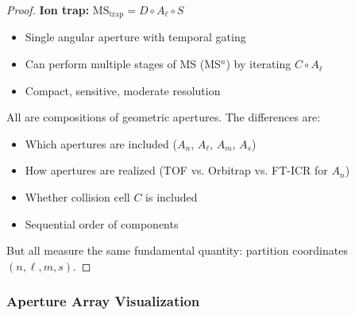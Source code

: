\begin{proof}
\textbf{Ion trap:} $\text{MS}_{\text{trap}} = D \circ A_\ell \circ S$
\begin{itemize}
    \item Single angular aperture with temporal gating
    \item Can perform multiple stages of MS (MS$^n$) by iterating $C \circ A_\ell$
    \item Compact, sensitive, moderate resolution
\end{itemize}

All are compositions of geometric apertures. The differences are:
\begin{itemize}
    \item Which apertures are included ($A_n$, $A_\ell$, $A_m$, $A_s$)
    \item How apertures are realized (TOF vs. Orbitrap vs. FT-ICR for $A_n$)
    \item Whether collision cell $C$ is included
    \item Sequential order of components
\end{itemize}

But all measure the same fundamental quantity: partition coordinates $(n,\ell,m,s)$.
\end{proof}

\subsubsection{Aperture Array Visualization}

